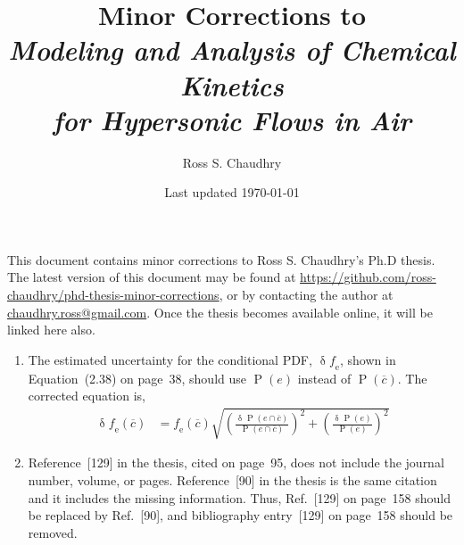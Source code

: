 \documentclass[11 pt]{article}
\title{Minor Corrections to \\
   \emph{Modeling and Analysis of Chemical Kinetics \\
         for Hypersonic Flows in Air} }
\author{Ross S. Chaudhry}
\date{Last updated \today}
\newcommand{\ol}{\overline}
\newcommand\myP{\operatorname{P}}
\newcommand\myerror{\operatorname{\delta}}
\newcommand\fe{\operatorname{\mathit{f}_e}}
\begin{document}
\maketitle

\noindent
This document contains minor corrections to Ross S. Chaudhry's Ph.D thesis.
The latest version of this document may be found at \url{https://github.com/ross-chaudhry/phd-thesis-minor-corrections},
   or by contacting the author at \href{mailto:chaudhry.ross@gmail.com}{chaudhry.ross@gmail.com}.
Once the thesis becomes available online, it will be linked here also.


\begin{enumerate}

\item
The estimated uncertainty for the conditional PDF, $\myerror\fe$,
   shown in Equation~(2.38) on page~38, should use $\myP\left(e\right)$
   instead of $\myP\left(\ol{c}\right)$.
The corrected equation is,
%
\begin{align*}
   \myerror \fe\left(\ol{c}\right) &= \fe\left(\ol{c}\right) \sqrt{ \left(\frac{\myerror \myP\left(e \cap \ol{c}\right)}{\myP\left(e \cap \ol{c}\right)}\right)^2
                                                                  + \left(\frac{\myerror \myP\left(           e \right)}{\myP\left(           e \right)}\right)^2 }
\end{align*}

\item
Reference~[129] in the thesis, cited on page~95,
   does not include the journal number, volume, or pages.
Reference~[90] in the thesis is the same citation and it includes the missing information.
Thus, Ref.~[129] on page~158 should be replaced by Ref.~[90],
   and bibliography entry~[129] on page~158 should be removed.

% 

\end{enumerate}

% 
% 
\end{document}
